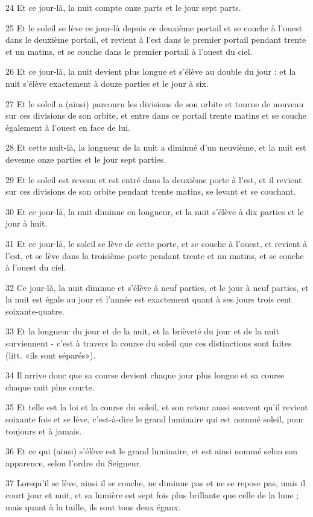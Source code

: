 \par 24 Et ce jour-là, la nuit compte onze parts et le jour sept parts.
\par 25 Et le soleil se lève ce jour-là depuis ce deuxième portail et se couche à l'ouest dans le deuxième portail, et revient à l'est dans le premier portail pendant trente et un matins, et se couche dans le premier portail à l'ouest du ciel.
\par 26 Et ce jour-là, la nuit devient plus longue et s'élève au double du jour : et la nuit s'élève exactement à douze parties et le jour à six.
\par 27 Et le soleil a (ainsi) parcouru les divisions de son orbite et tourne de nouveau sur ces divisions de son orbite, et entre dans ce portail trente matins et se couche également à l'ouest en face de lui.
\par 28 Et cette nuit-là, la longueur de la nuit a diminué d'un neuvième, et la nuit est devenue onze parties et le jour sept parties.
\par 29 Et le soleil est revenu et est entré dans la deuxième porte à l'est, et il revient sur ces divisions de son orbite pendant trente matins, se levant et se couchant.
\par 30 Et ce jour-là, la nuit diminue en longueur, et la nuit s'élève à dix parties et le jour à huit.
\par 31 Et ce jour-là, le soleil se lève de cette porte, et se couche à l'ouest, et revient à l'est, et se lève dans la troisième porte pendant trente et un matins, et se couche à l'ouest du ciel.
\par 32 Ce jour-là, la nuit diminue et s'élève à neuf parties, et le jour à neuf parties, et la nuit est égale au jour et l'année est exactement quant à ses jours trois cent soixante-quatre.
\par 33 Et la longueur du jour et de la nuit, et la brièveté du jour et de la nuit surviennent - c'est à travers la course du soleil que ces distinctions sont faites (litt. «ils sont séparés»).
\par 34 Il arrive donc que sa course devient chaque jour plus longue et sa course chaque nuit plus courte.
\par 35 Et telle est la loi et la course du soleil, et son retour aussi souvent qu'il revient soixante fois et se lève, c'est-à-dire le grand luminaire qui est nommé soleil, pour toujours et à jamais.
\par 36 Et ce qui (ainsi) s'élève est le grand luminaire, et est ainsi nommé selon son apparence, selon l'ordre du Seigneur.
\par 37 Lorsqu'il se lève, ainsi il se couche, ne diminue pas et ne se repose pas, mais il court jour et nuit, et sa lumière est sept fois plus brillante que celle de la lune ; mais quant à la taille, ils sont tous deux égaux.

